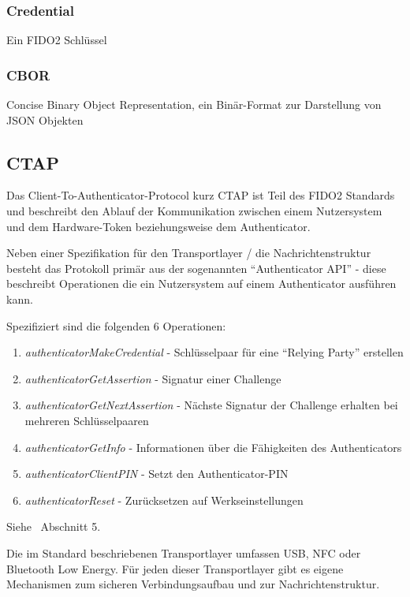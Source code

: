 \documentclass[journal]{IEEEtran}
\begin{document}
\subsubsection{Credential}

Ein FIDO2 Schlüssel

\subsubsection{CBOR}

Concise Binary Object Representation, ein Binär-Format zur Darstellung von JSON
Objekten

\subsection{CTAP}

Das Client-To-Authenticator-Protocol kurz CTAP ist Teil des FIDO2 Standards und
beschreibt den Ablauf der Kommunikation zwischen einem Nutzersystem und dem
Hardware-Token beziehungsweise dem Authenticator.

Neben einer Spezifikation für den Transportlayer / die Nachrichtenstruktur
besteht das Protokoll primär aus der sogenannten ``Authenticator API'' - diese
beschreibt Operationen die ein Nutzersystem auf einem Authenticator ausführen
kann.~\cite{ctapspec}

Spezifiziert sind die folgenden 6 Operationen:

\begin{enumerate}
	\item \textit{authenticatorMakeCredential} - Schlüsselpaar für eine
		``Relying Party'' erstellen
	\item \textit{authenticatorGetAssertion} - Signatur einer Challenge
	\item \textit{authenticatorGetNextAssertion} - Nächste Signatur der
		Challenge erhalten bei mehreren Schlüsselpaaren
	\item \textit{authenticatorGetInfo} - Informationen über die Fähigkeiten
		des Authenticators
	\item \textit{authenticatorClientPIN} - Setzt den Authenticator-PIN
	\item \textit{authenticatorReset} - Zurücksetzen auf Werkseinstellungen
\end{enumerate}

Siehe~\cite{ctapspec} Abschnitt 5.

Die im Standard beschriebenen Transportlayer umfassen USB, NFC oder Bluetooth
Low Energy. Für jeden dieser Transportlayer gibt es eigene Mechanismen zum
sicheren Verbindungsaufbau und zur Nachrichtenstruktur.~\cite{ctapspec}
\end{document}
